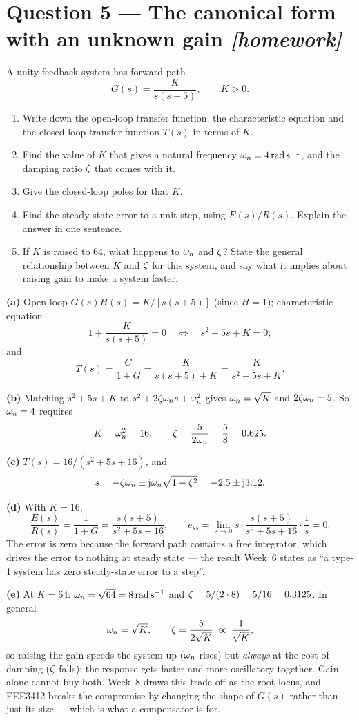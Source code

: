 \documentclass[11pt,a4paper]{article}
\newcommand{\athome}{\hfill{\small\color{fflag}\itshape[homework]}}
\begin{document}
\section*{Question 5 --- The canonical form with an unknown gain \athome}

A unity-feedback system has forward path
\[
  G(s)=\frac{K}{s(s+5)},\qquad K>0 .
\]

\begin{enumerate}[label=(\alph*)]
\item Write down the open-loop transfer function, the characteristic equation
      and the closed-loop transfer function $T(s)$ in terms of $K$.
\item Find the value of $K$ that gives a natural frequency
      $\omega_{n}=\SI{4}{\radian\per\second}$, and the damping ratio $\zeta$ that comes
      with it.
\item Give the closed-loop poles for that $K$.
\item Find the steady-state error to a unit step, using $E(s)/R(s)$. Explain
      the answer in one sentence.
\item If $K$ is raised to $64$, what happens to $\omega_{n}$ and $\zeta$? State the
      general relationship between $K$ and $\zeta$ for this system, and say what
      it implies about raising gain to make a system faster.
\end{enumerate}

\begin{solution}
\textbf{(a)} Open loop $G(s)H(s)=K/[s(s+5)]$ (since $H=1$); characteristic
equation
\[
  1+\frac{K}{s(s+5)}=0
  \quad\Longleftrightarrow\quad
  s^{2}+5s+K=0 ;
\]
and
\[
  T(s)=\frac{G}{1+G}=\frac{K}{s(s+5)+K}=\frac{K}{s^{2}+5s+K} .
\]

\medskip
\textbf{(b)} Matching $s^{2}+5s+K$ to $s^{2}+2\zeta\omega_{n} s+\omega_{n}^{2}$ gives
$\omega_{n}=\sqrt{K}$ and $2\zeta\omega_{n}=5$. So $\omega_{n}=4$ requires
\[
  K=\omega_{n}^{2}=16,
  \qquad
  \zeta=\frac{5}{2\omega_{n}}=\frac{5}{8}=0.625 .
\]

\medskip
\textbf{(c)} $T(s)=16/(s^{2}+5s+16)$, and
\[
  s=-\zeta\omega_{n}\pm\mathrm{j}\omega_{n}\sqrt{1-\zeta^{2}}
   =-2.5\pm\mathrm{j}3.12 .
\]

\medskip
\textbf{(d)} With $K=16$,
\[
  \frac{E(s)}{R(s)}=\frac{1}{1+G}=\frac{s(s+5)}{s^{2}+5s+16},
  \qquad
  e_{ss}=\lim_{s\to0}s\cdot\frac{s(s+5)}{s^{2}+5s+16}\cdot\frac{1}{s}=0 .
\]
The error is zero because the forward path contains a free integrator, which
drives the error to nothing at steady state --- the result Week~6 states as
``a type-1 system has zero steady-state error to a step''.

\medskip
\textbf{(e)} At $K=64$: $\omega_{n}=\sqrt{64}=\SI{8}{\radian\per\second}$ and
$\zeta=5/(2\cdot8)=5/16=0.3125$. In general
\[
  \omega_{n}=\sqrt{K},\qquad \zeta=\frac{5}{2\sqrt{K}} \;\propto\; \frac{1}{\sqrt{K}} ,
\]
so raising the gain speeds the system up ($\omega_{n}$ rises) but \emph{always} at the
cost of damping ($\zeta$ falls): the response gets faster and more oscillatory
together. Gain alone cannot buy both. Week~8 draws this trade-off as the root
locus, and FEE3412 breaks the compromise by changing the shape of $G(s)$ rather
than just its size --- which is what a compensator is for.
\end{solution}
\end{document}
